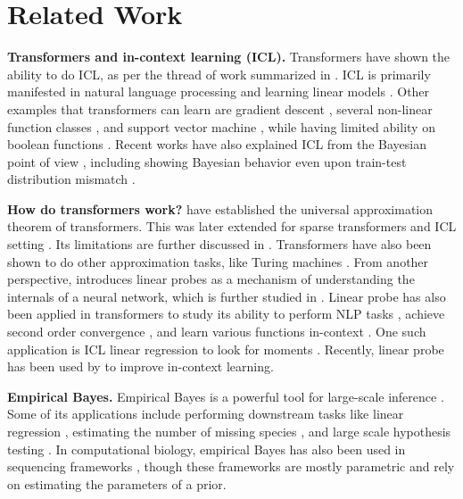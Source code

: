 \section{Related Work}
\textbf{Transformers and in-context learning (ICL). }
Transformers have shown the ability to do ICL, as per the thread of work summarized in 
\cite{dong2022survey}. 
ICL is primarily manifested in natural language processing \cite{brown2020language, dai2022can} 
and learning linear models \cite{akyurek2022learning, zhang2023trained}. 
Other examples that transformers can learn are gradient descent \cite{bai2024transformers}, 
several non-linear function classes \cite{garg2022can}, and support vector machine \cite{tarzanagh2023transformers}, 
while having limited ability on boolean functions \cite{bhattamishra2023understanding}. 
Recent works have also explained ICL from the Bayesian point of view 
\cite{muller2024bayes, panwar2023context}, including showing Bayesian behavior even upon train-test distribution mismatch \cite{xie2021explanation}. 


\textbf{How do transformers work?} 
\cite{yun2019transformers} have established the universal approximation theorem of transformers. 
This was later extended for sparse transformers \cite{yun2020n} and ICL setting \cite{furuya2024transformers}. Its limitations are further discussed in \cite{nath2024transformers}. 
Transformers have also been shown to do other approximation tasks, like Turing machines 
\cite{wei2022statistically, perez2021attention}. 
From another perspective, 
\cite{alain2018understanding} introduces linear probes as a mechanism of understanding the internals of a neural network, which is further studied in \cite{belinkov2022probing}. 
Linear probe has also been applied in transformers to study its ability to perform NLP tasks \cite{tenney2019bert}, achieve second order convergence \cite{fu2024transformers}, and learn various functions in-context \cite{guo2023transformers}. 
One such application is ICL linear regression to look for moments \cite{akyurek2022learning}. 
Recently, linear probe has been used by \cite{abbas2024enhancing} to improve in-context learning. 

\textbf{Empirical Bayes. }
Empirical Bayes is a powerful tool for large-scale inference \cite{efron2012large}. 
Some of its applications include performing downstream tasks like linear regression 
\cite{kim2024flexible, mukherjee2023mean}, estimating the number of missing species \cite{fisher1943relation}, 
and large scale hypothesis testing \cite{efron2001empirical}. 
In computational biology, empirical Bayes has also been used in sequencing frameworks 
\cite{hardcastle2010bayseq, leng2013ebseq}, 
though these frameworks are mostly parametric and rely on estimating the parameters of a prior. 

